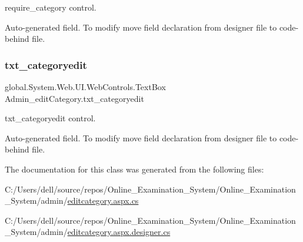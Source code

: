 require\+\_\+category control. 

Auto-\/generated field. To modify move field declaration from designer file to code-\/behind file. \mbox{\label{class_admin__edit_category_a2cf7a22b501c62d6a8cd307cd34bbcd4}} 
\subsubsection{\texorpdfstring{txt\_categoryedit}{txt\_categoryedit}}
{\footnotesize\ttfamily global.\+System.\+Web.\+U\+I.\+Web\+Controls.\+Text\+Box Admin\+\_\+edit\+Category.\+txt\+\_\+categoryedit\hspace{0.3cm}{\ttfamily [protected]}}



txt\+\_\+categoryedit control. 

Auto-\/generated field. To modify move field declaration from designer file to code-\/behind file. 

The documentation for this class was generated from the following files\+:\begin{DoxyCompactItemize}
\item 
C\+:/\+Users/dell/source/repos/\+Online\+\_\+\+Examination\+\_\+\+System/\+Online\+\_\+\+Examination\+\_\+\+System/admin/\mbox{\hyperlink{editcategory_8aspx_8cs}{editcategory.\+aspx.\+cs}}\item 
C\+:/\+Users/dell/source/repos/\+Online\+\_\+\+Examination\+\_\+\+System/\+Online\+\_\+\+Examination\+\_\+\+System/admin/\mbox{\hyperlink{editcategory_8aspx_8designer_8cs}{editcategory.\+aspx.\+designer.\+cs}}\end{DoxyCompactItemize}
